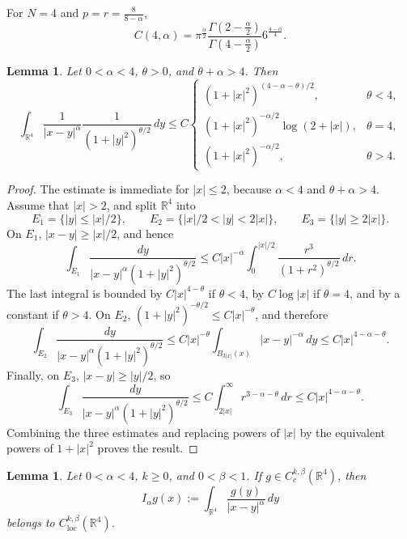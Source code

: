 \documentclass[11pt]{article}
\newtheorem{lemma}[theorem]{Lemma}
\numberwithin{equation}{section}
\begin{document}
For \(N=4\) and \(p=r=\frac{8}{8-\alpha}\),
\begin{equation*}
C(4,\alpha)=
\pi^{\frac{\alpha}{2}}
\frac{\Gamma\left(2-\frac{\alpha}{2}\right)}
{\Gamma\left(4-\frac{\alpha}{2}\right)}
6^{\frac{4-\alpha}{4}}.
\end{equation*}

\begin{lemma}\label{lem:Riesz-estimate}
Let \(0<\alpha<4\), \(\theta>0\), and \(\theta+\alpha>4\). Then
\[
\int_{\mathbb R^{4}}
\frac{1}{|x-y|^{\alpha}}
\frac{1}{(1+|y|^{2})^{\theta/2}}\,dy
\leq C
\begin{cases}
(1+|x|^{2})^{(4-\alpha-\theta)/2},&\theta<4,\\
(1+|x|^{2})^{-\alpha/2}\log(2+|x|),&\theta=4,\\
(1+|x|^{2})^{-\alpha/2},&\theta>4.
\end{cases}
\]
\end{lemma}

\begin{proof}
The estimate is immediate for \(|x|\leq2\), because
\(\alpha<4\) and \(\theta+\alpha>4\). Assume that \(|x|>2\), and
split \(\mathbb R^{4}\) into
\[
E_{1}=\{|y|\leq |x|/2\},\qquad
E_{2}=\{|x|/2<|y|<2|x|\},\qquad
E_{3}=\{|y|\geq2|x|\}.
\]
On \(E_{1}\), \(|x-y|\geq |x|/2\), and hence
\[
\int_{E_{1}}\frac{dy}{|x-y|^{\alpha}(1+|y|^{2})^{\theta/2}}
\leq C|x|^{-\alpha}
\int_{0}^{|x|/2}\frac{r^{3}}{(1+r^{2})^{\theta/2}}\,dr.
\]
The last integral is bounded by \(C|x|^{4-\theta}\) if
\(\theta<4\), by \(C\log|x|\) if \(\theta=4\), and by a constant
if \(\theta>4\). On \(E_{2}\),
\((1+|y|^{2})^{-\theta/2}\leq C|x|^{-\theta}\), and therefore
\[
\int_{E_{2}}\frac{dy}{|x-y|^{\alpha}(1+|y|^{2})^{\theta/2}}
\leq C|x|^{-\theta}
\int_{B_{3|x|}(x)}|x-y|^{-\alpha}\,dy
\leq C|x|^{4-\alpha-\theta}.
\]
Finally, on \(E_{3}\), \(|x-y|\geq |y|/2\), so
\[
\int_{E_{3}}\frac{dy}{|x-y|^{\alpha}(1+|y|^{2})^{\theta/2}}
\leq C\int_{2|x|}^{\infty}r^{3-\alpha-\theta}\,dr
\leq C|x|^{4-\alpha-\theta}.
\]
Combining the three estimates and replacing powers of \(|x|\) by the
equivalent powers of \(1+|x|^{2}\) proves the result.
\end{proof}

\begin{lemma}\label{lem:Riesz-regularity}
Let \(0<\alpha<4\), \(k\geq0\), and \(0<\beta<1\). If \(g\in C^{k,\beta}_{c}(\mathbb R^{4})\), then
\[
I_{\alpha}g(x):=
\int_{\mathbb R^{4}}\frac{g(y)}{|x-y|^{\alpha}}\,dy
\]
belongs to \(C^{k,\beta}_{\operatorname{loc}}(\mathbb R^{4})\).
\end{lemma}
\end{document}
